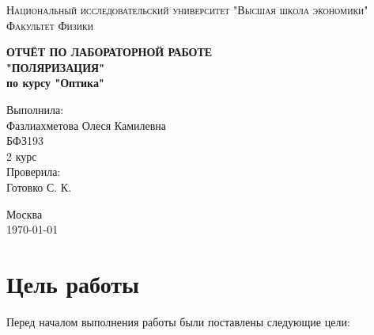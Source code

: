\documentclass[a4paper, 12pt]{article}
\begin{document}
\begin{titlepage}
\begin{center}
\textsc{Национальный исследовательский университет "Высшая школа экономики"\\[5mm]
Факультет Физики}

\vfill

\textbf{ОТЧЁТ ПО ЛАБОРАТОРНОЙ РАБОТЕ \\[3mm]
"ПОЛЯРИЗАЦИЯ"\\[3mm]
по курсу "Оптика"
\\[20mm]
}
\end{center}

\hfill
\begin{minipage}{.5\textwidth}
Выполнила:\\[2mm] 
Фазлиахметова Олеся Камилевна\\
БФЗ193\\
2 курс\\[5mm]

Проверила:\\[2mm] 
Готовко С. К. 
\end{minipage}%
\vfill
\begin{center}
 Москва\\
 \today
\end{center}
\end{titlepage}



\tableofcontents

\newpage

	\section{Цель работы}

Перед началом выполнения работы были поставлены следующие цели:
\end{document}
